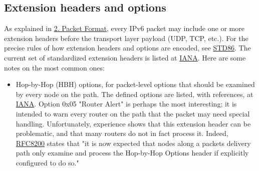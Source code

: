 \documentclass[
]{article}
\begin{document}
\subsection{Extension headers and
options}\label{extension-headers-and-options}

As explained in \hyperref[packet-format]{2. Packet Format}, every IPv6
packet may include one or more extension headers before the transport
layer payload (UDP, TCP, etc.). For the precise rules of how extension
headers and options are encoded, see
\href{https://www.rfc-editor.org/info/std86}{STD86}. The current set of
standardized extension headers is listed at
\href{https://www.iana.org/assignments/ipv6-parameters/ipv6-parameters.xhtml\#extension-header}{IANA}.
Here are some notes on the most common ones:

\begin{itemize}
\item
  Hop-by-Hop (HBH) options, for packet-level options that should be
  examined by every node on the path. The defined options are listed,
  with references, at
  \href{https://www.iana.org/assignments/ipv6-parameters/ipv6-parameters.xhtml\#ipv6-parameters-2}{IANA}.
  Option 0x05 "Router Alert" is perhaps the most interesting; it is
  intended to warn every router on the path that the packet may need
  special handling. Unfortunately, experience shows that this extension
  header can be problematic, and that many routers do not in fact
  process it. Indeed,
  \href{https://www.rfc-editor.org/info/rfc8200}{RFC8200} states that
  "it is now expected that nodes along a packet\textquotesingle s
  delivery path only examine and process the Hop-by-Hop Options header
  if explicitly configured to do so."


\end{itemize}
\end{document}
